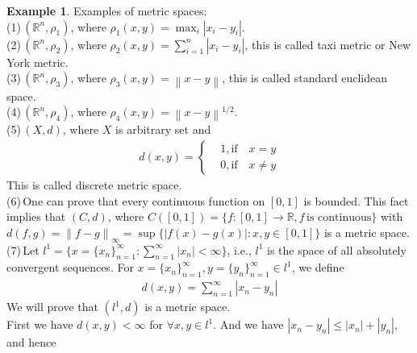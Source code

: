 \documentclass[12pt,leqno]{amsart}
\theoremstyle{definition}
\newtheorem{example}{Example}[section]
\begin{document}
\begin{example}
Examples of metric spaces:\\
\hspace*{1em}(1)\,$(\mathbb{R}^n,\rho_1)$, where $\rho_1(x,y) = \max_i |x_i-y_i|$. \\
\hspace*{1em}(2)\,$(\mathbb{R}^n,\rho_2)$, where $\rho_2(x,y) = \sum^n_{i=1} |x_i-y_i|$, this is called taxi metric or New York metric.\\
\hspace*{1em}(3)\,$(\mathbb{R}^n,\rho_3)$, where $\rho_3(x,y) = \left\|x-y\right\|$, this is called standard euclidean space.\\
\hspace*{1em}(4)\,$(\mathbb{R}^n,\rho_4)$, where $\rho_4(x,y) = \left\|x-y\right\|^{1/2}$.\\
\hspace*{1em}(5)\,$(X,d)$, where $X$ is arbitrary set and 
\begin{align*}
    d(x,y) = \left\{
    \begin{aligned}
    & 1, \text{if} \quad x = y\\
    & 0, \text{if} \quad x \neq y
    \end{aligned}
    \right.
\end{align*}
\hspace*{2.5em}This is called discrete metric space. \\
\hspace*{1em}(6)\,One can prove that every continuous function on $[0,1]$ is bounded. This fact implies that $(C,d)$, where $C([0,1]) = \{f:[0,1]\rightarrow \mathbb{R}, f \, \text{is continuous}\}$ with $d(f,g) = \left\|f-g\right\|_\infty = \sup \{|f(x) - g(x)|: x,y\in[0,1]\}$ is a metric space.\\
\hspace*{1em}(7)\,Let $l^1 = \{x = \{x_n\}^\infty_{n=1}: \sum^\infty_{n=1}|x_n| < \infty\}$, i.e., $l^1$ is the space of all absolutely convergent sequences. For $x = \{x_n\}^\infty_{n=1}, y = \{y_n\}^\infty_{n=1} \in l^1$, we define 
\begin{align*}
    d(x,y) = \sum^\infty_{n=1} |x_n - y_n|
\end{align*}
We will prove that $(l^1,d)$ is a metric space.\\
\hspace*{2.5em}First we have $d(x,y) < \infty$ for $\forall x,y \in l^1$. And we have $|x_n-y_n|\leq |x_n|+|y_n|$, and hence
\begin{align*}

\end{align*}
\end{example}
\end{document}
